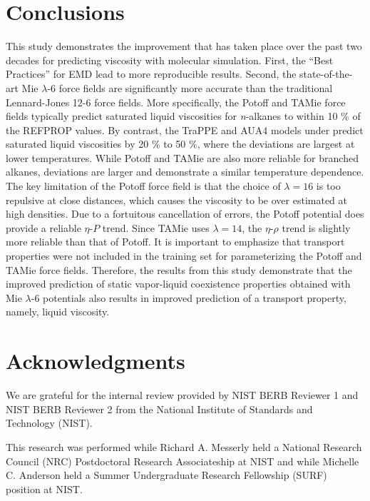 \documentclass[preprint,review,12pt]{elsarticle}
\begin{document}
	
	\section{Conclusions} \label{Conclusions}
	
	This study demonstrates the improvement that has taken place over the past two decades for predicting viscosity with molecular simulation. First, the ``Best Practices'' for EMD lead to more reproducible results. Second, the state-of-the-art Mie $\lambda$-6 force fields are significantly more accurate than the traditional Lennard-Jones 12-6 force fields. More specifically, the Potoff and TAMie force fields typically predict saturated liquid viscosities for \textit{n}-alkanes to within 10 \% of the REFPROP values. By contrast, the TraPPE and AUA4 models under predict saturated liquid viscosities by 20 \% to 50 \%, where the deviations are largest at lower temperatures. While Potoff and TAMie are also more reliable for branched alkanes, deviations are larger and demonstrate a similar temperature dependence. The key limitation of the Potoff force field is that the choice of $\lambda = 16$ is too repulsive at close distances, which causes the viscosity to be over estimated at high densities. Due to a fortuitous cancellation of errors, the Potoff potential does provide a reliable $\eta$-$P$ trend. Since TAMie uses $\lambda =14$, the $\eta$-$\rho$ trend is slightly more reliable than that of Potoff. It is important to emphasize that transport properties were not included in the training set for parameterizing the Potoff and TAMie force fields. Therefore, the results from this study demonstrate that the improved prediction of static vapor-liquid coexistence properties obtained with Mie $\lambda$-6 potentials also results in improved prediction of a transport property, namely, liquid viscosity.
	
	\section*{Acknowledgments}
	
	We are grateful for the internal review provided by NIST BERB Reviewer 1 and NIST BERB Reviewer 2 from the National Institute of Standards and Technology (NIST). 
	
	This research was performed while Richard A. Messerly held a National Research Council (NRC) Postdoctoral Research Associateship at NIST and while Michelle C. Anderson held a Summer Undergraduate Research Fellowship (SURF) position at NIST.
	
\end{document}

